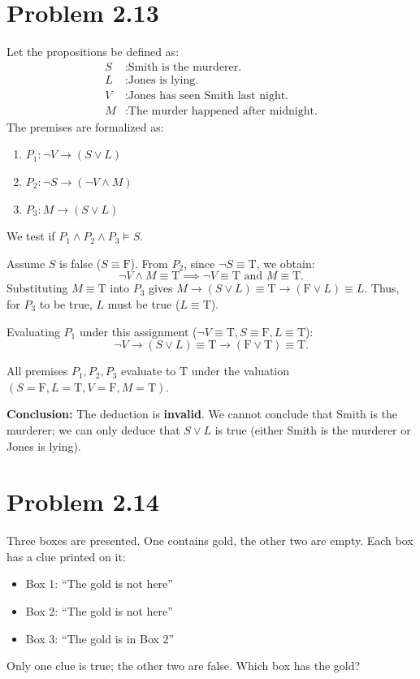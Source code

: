 \documentclass[12pt]{article}
\begin{document}
\section*{Problem 2.13}
Let the propositions be defined as:
\begin{align*}
S &: \text{Smith is the murderer.} \\
L &: \text{Jones is lying.} \\
V &: \text{Jones has seen Smith last night.} \\
M &: \text{The murder happened after midnight.}
\end{align*}
\newpage
The premises are formalized as:
\begin{enumerate}
    \item $P_1: \neg V \to (S \lor L)$
    \item $P_2: \neg S \to (\neg V \land M)$
    \item $P_3: M \to (S \lor L)$
\end{enumerate}

We test if $P_1 \land P_2 \land P_3 \models S$.

Assume $S$ is false ($S \equiv \text{F}$). From $P_2$, since $\neg S \equiv \text{T}$, we obtain:
\[
\neg V \land M \equiv \text{T} \implies \neg V \equiv \text{T} \text{ and } M \equiv \text{T}.
\]
Substituting $M \equiv \text{T}$ into $P_3$ gives $M \to (S \lor L) \equiv \text{T} \to (\text{F} \lor L) \equiv L$. Thus, for $P_3$ to be true, $L$ must be true ($L \equiv \text{T}$).

Evaluating $P_1$ under this assignment ($\neg V \equiv \text{T}, S \equiv \text{F}, L \equiv \text{T}$):
\[
\neg V \to (S \lor L) \equiv \text{T} \to (\text{F} \lor \text{T}) \equiv \text{T}.
\]

All premises $P_1, P_2, P_3$ evaluate to $\text{T}$ under the valuation $(S=\text{F}, L=\text{T}, V=\text{F}, M=\text{T})$. 

\noindent\textbf{Conclusion:}
The deduction is \textbf{invalid}. We cannot conclude that Smith is the murderer; we can only deduce that $S \lor L$ is true (either Smith is the murderer or Jones is lying). 

\section*{Problem 2.14}
\noindent Three boxes are presented. One contains gold, the other two are empty. Each box has a clue printed on it:
\begin{itemize}
    \item Box 1: ``The gold is not here''
    \item Box 2: ``The gold is not here''
    \item Box 3: ``The gold is in Box 2''
\end{itemize}
Only one clue is true; the other two are false. Which box has the gold?
 
\end{document}
